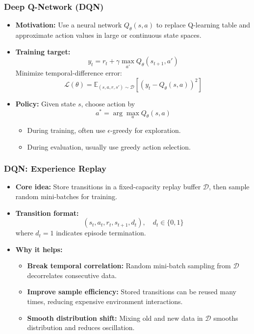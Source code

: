 \documentclass[11pt,aspectratio=169,xcolor={dvipsnames},usepdftitle=false]{beamer}
\begin{document}
\begin{frame}
\frametitle{Deep Q-Network (DQN)}
\begin{itemize}
	\item \textbf{Motivation:} Use a neural network $Q_\theta(s,a)$ to replace Q-learning table and approximate action values in large or continuous state spaces.
	
	\item \textbf{Training target:}
	\vspace{-1.5em}
    $$
	y_t = r_t + \gamma \max_{a'} Q_{\theta}(s_{t+1}, a')
	$$
	Minimize temporal-difference error:
	\vspace{-1.0em}
    $$
	\mathcal{L}(\theta)=\mathbb{E}_{(s,a,r,s')\sim\mathcal{D}}\left[(y_t-Q_\theta(s,a))^2\right]
	$$
    \vspace{-1.5em}
	\item \textbf{Policy:}
	Given state $s$, choose action by
    \vspace{-1.0em}
	$$
	a^* = \arg\max_a Q_\theta(s,a)
	$$
    \vspace{-1.5em}
    \begin{itemize}
	\item During training, often use $\epsilon$-greedy for exploration.
	\item During evaluation, usually use greedy action selection.
    \end{itemize}
    

\end{itemize}
\end{frame}


\begin{frame}
\frametitle{DQN: Experience Replay}
\begin{itemize}
	\item \textbf{Core idea:}
	Store transitions in a fixed-capacity replay buffer $\mathcal{D}$,
	then sample random mini-batches for training.

	\item \textbf{Transition format:}
	$$
	(s_t, a_t, r_t, s_{t+1}, d_t), \quad d_t \in \{0,1\}
	$$
	where $d_t=1$ indicates episode termination.

	\item \textbf{Why it helps:}
	\begin{itemize}
		\item \textbf{Break temporal correlation:}
		Random mini-batch sampling from $\mathcal{D}$ decorrelates consecutive data.

		\item \textbf{Improve sample efficiency:}
		Stored transitions can be reused many times, reducing expensive environment interactions.

		\item \textbf{Smooth distribution shift:}
		Mixing old and new data in $\mathcal{D}$ smooths distribution and reduces oscillation.
	\end{itemize}

\end{itemize}
\end{frame}
\end{document}
